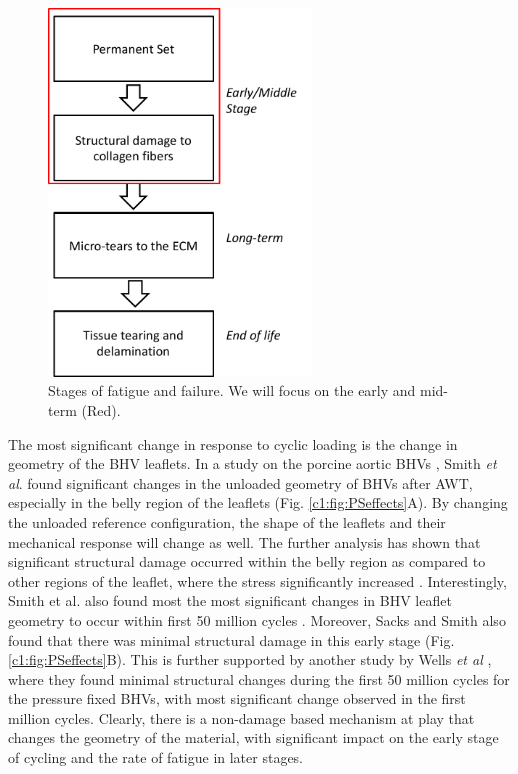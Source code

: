 \begin{figure}[hbt]
\centering
\includegraphics[width=2.75in]{Images/chapter1/damageprocess.pdf}
\caption{Stages of fatigue and failure. We will focus on the early and mid-term (Red).}
\label{c1:fig:damageprocess}
\end{figure}

    The most significant change in response to cyclic loading is the change in geometry of the BHV leaflets. In a study on the porcine aortic BHVs \cite{smith_high_1997},  Smith \textit{et al}. found significant changes in the unloaded geometry of BHVs after AWT, especially in the belly region of the leaflets (Fig. \ref{c1:fig:PSeffects}A). By changing the unloaded reference configuration, the shape of the leaflets and their mechanical response will change as well. The further analysis has shown that significant structural damage occurred within the belly region as compared to other regions of the leaflet, where the stress significantly increased \cite{smith_fatigue_1999}. Interestingly, Smith et al. also found most the most significant changes in BHV leaflet geometry to occur within first 50 million cycles \cite{smith_high_1997}. Moreover, Sacks and Smith \cite{sacks_effects_1998} also found that there was minimal structural damage in this early stage (Fig. \ref{c1:fig:PSeffects}B). This is further supported by another study by Wells \textit{et al} \cite{wells_cyclic_2005}, where they found minimal structural changes during the first 50 million cycles for the pressure fixed BHVs, with most significant change observed in the first million cycles. Clearly, there is a non-damage based mechanism at play that changes the geometry of the material, with significant impact on the early stage of cycling and the rate of fatigue in later stages. 


